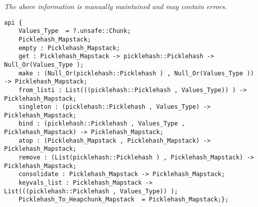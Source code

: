 \label{api:Linking\_Mapstack}

{\tiny \it The above information is manually maintained and may contain errors.}
\begin{verbatim}
api {
    Values_Type  = ?.unsafe::Chunk;
    Picklehash_Mapstack;
    empty : Picklehash_Mapstack;
    get : Picklehash_Mapstack -> picklehash::Picklehash -> Null_Or(Values_Type );
    make : (Null_Or(picklehash::Picklehash ) , Null_Or(Values_Type )) -> Picklehash_Mapstack;
    from_listi : List(((picklehash::Picklehash , Values_Type)) ) -> Picklehash_Mapstack;
    singleton : (picklehash::Picklehash , Values_Type) -> Picklehash_Mapstack;
    bind : (picklehash::Picklehash , Values_Type , Picklehash_Mapstack) -> Picklehash_Mapstack;
    atop : (Picklehash_Mapstack , Picklehash_Mapstack) -> Picklehash_Mapstack;
    remove : (List(picklehash::Picklehash ) , Picklehash_Mapstack) -> Picklehash_Mapstack;
    consolidate : Picklehash_Mapstack -> Picklehash_Mapstack;
    keyvals_list : Picklehash_Mapstack -> List(((picklehash::Picklehash , Values_Type)) );
    Picklehash_To_Heapchunk_Mapstack  = Picklehash_Mapstack;};
\end{verbatim}

